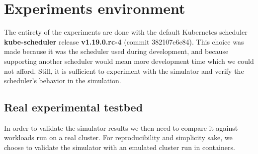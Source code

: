 \documentclass[12pt, a4paper]{memoir}
\begin{document}
\section{Experiments environment}

The entirety of the experiments are done with the default Kubernetes scheduler
\textbf{kube-scheduler} release \textbf{v1.19.0.rc-4} (commit 382107e6c84).
This choice was made because it was the scheduler used during development, and
because supporting another scheduler would mean more development time which we
could not afford. Still, it is sufficient to experiment with the simulator and
verify the scheduler's behavior in the simulation.


% 

\subsection{Real experimental testbed}

In order to validate the simulator results we then need to compare it against
workloads run on a real cluster. For reproducibility and simplicity sake, we
choose to validate the simulator with an emulated cluster run in
containers.\\
\end{document}
